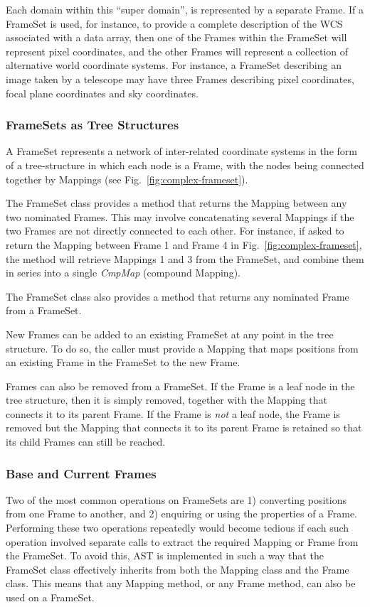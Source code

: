 \documentclass[final,authoryear,5p,times,twocolumn]{elsarticle}
\begin{document}
Each domain within this ``super domain'', is represented by a separate
Frame. If a FrameSet is used, for instance, to provide a complete
description of the WCS associated with a data array, then one of the
Frames within the FrameSet will represent pixel coordinates, and the
other Frames will represent a collection of alternative world coordinate
systems. For instance, a FrameSet describing an image taken by a
telescope may have three Frames describing pixel coordinates, focal plane
coordinates and sky coordinates.

\subsubsection{FrameSets as Tree Structures}
A FrameSet represents a network of inter-related coordinate systems in
the form of a tree-structure in which each node is a Frame, with the
nodes being connected together by Mappings (see Fig.~\ref{fig:complex-frameset}).

The FrameSet class provides a method that returns the Mapping between any
two nominated Frames. This may involve concatenating several Mappings if
the two Frames are not directly connected to each other. For instance, if
asked to return the Mapping between Frame 1 and Frame 4 in
Fig.~\ref{fig:complex-frameset}, the method will retrieve Mappings 1 and
3 from the FrameSet, and combine them in series into a single
\emph{CmpMap} (compound Mapping).

The FrameSet class also provides a method that returns any nominated Frame
from a FrameSet.

New Frames can be added to an existing FrameSet at any point in the tree
structure. To do so, the caller must provide a Mapping that maps positions
from an existing Frame in the FrameSet to the new Frame.

Frames can also be removed from a FrameSet. If the Frame is a leaf node
in the tree structure, then it is simply removed, together with the
Mapping that  connects it to its parent Frame. If the Frame is \emph{not}
a leaf node, the Frame is removed but the Mapping that connects it to its
parent Frame is retained so that its child Frames can still be reached.

\subsubsection{Base and Current Frames}
\label{sec:basecurrent}
Two of the most common operations on FrameSets are 1)
converting positions from one Frame to another, and 2) enquiring or using
the properties of a Frame. Performing these two operations repeatedly
would become tedious if each such operation involved separate calls
to extract the required Mapping or
Frame from the FrameSet. To avoid this, AST is implemented in such a way
that the FrameSet class effectively inherits from both the Mapping class
and the Frame class. This means that any Mapping method, or any Frame
method, can also be used on a FrameSet.
\end{document}
